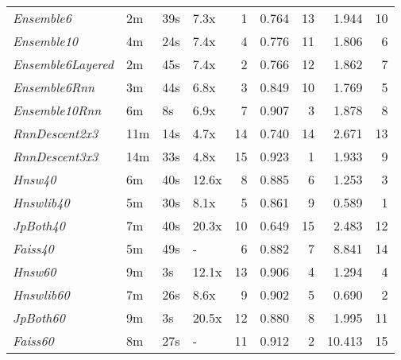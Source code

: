 \begin{tabular}{llllrrrrr}
\toprule
\midrule
\emph{Ensemble6} & 2m & 39s & 7.3x & 1 & 0.764 & 13 & 1.944 & 10 \\
\emph{Ensemble10} & 4m & 24s & 7.4x & 4 & 0.776 & 11 & 1.806 & 6 \\
\emph{Ensemble6Layered} & 2m & 45s & 7.4x & 2 & 0.766 & 12 & 1.862 & 7 \\
\emph{Ensemble6Rnn} & 3m & 44s & 6.8x & 3 & 0.849 & 10 & 1.769 & 5 \\
\emph{Ensemble10Rnn} & 6m & 8s & 6.9x & 7 & 0.907 & 3 & 1.878 & 8 \\
\emph{RnnDescent2x3} & 11m & 14s & 4.7x & 14 & 0.740 & 14 & 2.671 & 13 \\
\emph{RnnDescent3x3} & 14m & 33s & 4.8x & 15 & 0.923 & 1 & 1.933 & 9 \\
\emph{Hnsw40} & 6m & 40s & 12.6x & 8 & 0.885 & 6 & 1.253 & 3 \\
\emph{Hnswlib40} & 5m & 30s & 8.1x & 5 & 0.861 & 9 & 0.589 & 1 \\
\emph{JpBoth40} & 7m & 40s & 20.3x & 10 & 0.649 & 15 & 2.483 & 12 \\
\emph{Faiss40} & 5m & 49s & - & 6 & 0.882 & 7 & 8.841 & 14 \\
\emph{Hnsw60} & 9m & 3s & 12.1x & 13 & 0.906 & 4 & 1.294 & 4 \\
\emph{Hnswlib60} & 7m & 26s & 8.6x & 9 & 0.902 & 5 & 0.690 & 2 \\
\emph{JpBoth60} & 9m & 3s & 20.5x & 12 & 0.880 & 8 & 1.995 & 11 \\
\emph{Faiss60} & 8m & 27s & - & 11 & 0.912 & 2 & 10.413 & 15 \\
\bottomrule
\end{tabular}
